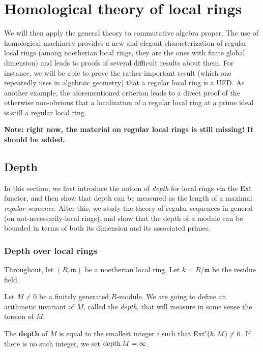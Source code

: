 \chapter{Homological theory of local rings}

We will then apply the general theory to commutative algebra proper. The use
of homological machinery provides a new and elegant characterization of regular local
rings (among noetherian local rings, they are the ones with finite global
dimension) and leads to proofs of several difficult results about them.
For instance, we will be able to prove the rather important result (which one
repeatedly uses in algebraic geometry) that a
regular local ring is a UFD.
As another example, the aforementioned criterion leads to a direct proof of
the otherwise non-obvious that a localization of a regular local ring at a
prime ideal is still a regular local ring.

\textbf{Note: right now, the material on regular local rings is still missing!
It should be added.}

\section{Depth}

In this section, we first introduce the notion of \emph{depth} for local rings
via the $\operatorname{Ext}$ functor, and then show that depth can be measured as the length
of a maximal \emph{regular sequence}. After this, we study the theory of
regular sequences in general (on not-necessarily-local rings), and show that
the depth of a module can be bounded in terms of both its dimension and its
associated primes. 
\subsection{Depth over local rings}

Throughout, let $(R, \mathfrak{m})$ be  a noetherian
local ring. Let $k = R/\mathfrak{m}$ be the residue field. 

Let $M \neq 0$ be a finitely generated $R$-module. We are going to define an
arithmetic invariant of $M$, called the \emph{depth}, that will measure in
some sense the torsion of $M$.

\begin{definition}
The \textbf{depth} of $M$ is equal to the smallest integer $i$
such that
$\operatorname{Ext}^i(k,M) \neq 0$. If there is no such integer, we set $\operatorname{depth} M = \infty$.
\end{definition}

